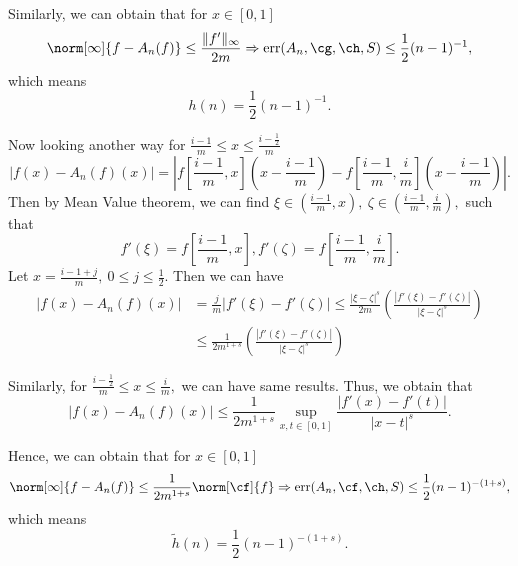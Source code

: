Similarly, we can obtain that for $x \in [0,1]$
\begin{equation}\label{errorg}\norm[\infty]{f-A_{n}(f)} \leq \frac{\|f'\|_{\infty}}{2m} \Rightarrow \err(A_n,\cg,\ch,S) \leq \frac{1}{2}(n-1)^{-1},
\end{equation}
which means
$$h(n)=\frac{1}{2}(n-1)^{-1}.$$

Now looking another way for $\frac{i-1}{m} \leq x \leq \frac{i-\frac{1}{2}}{m}$
$$\left|f(x)-A_{n}(f)(x)\right|=\left|f\left[\frac{i-1}{m},x\right]\left(x-\frac{i-1}{m}\right)-f\left[\frac{i-1}{m},\frac{i}{m}\right]\left(x-\frac{i-1}{m}\right)\right|.$$
Then by Mean Value theorem, we can find $\xi \in \left(\frac{i-1}{m},x\right), \ \zeta \in \left(\frac{i-1}{m},\frac{i}{m}\right),$ such that
$$f'(\xi)=f\left[\frac{i-1}{m},x\right],f'(\zeta)=f\left[\frac{i-1}{m},\frac{i}{m}\right].$$
Let $x=\frac{i-1+j}{m}, \ 0 \leq j \leq \frac{1}{2}.$ Then we can have
\begin{align*}
\left|f(x)-A_{n}(f)(x)\right|&=\frac{j}{m}|f'(\xi)-f'(\zeta)| \leq \frac{|\xi-\zeta|^{s}}{2m}\left(\frac{|f'(\xi)-f'(\zeta)|}{|\xi-\zeta|^{s}}\right)  \\
 & \leq \frac{1}{2m^{1+s}}\left(\frac{|f'(\xi)-f'(\zeta)|}{|\xi-\zeta|^{s}}\right)
\end{align*}

Similarly, for $\frac{i-\frac{1}{2}}{m} \leq x \leq \frac{i}{m},$ we can have same results.
Thus, we obtain that
$$\left|f(x)-A_{n}(f)(x)\right|\leq \frac{1}{2m^{1+s}}\sup\limits_{x,t \in [0,1]}\frac{|f'(x)-f'(t)|}{|x-t|^{s}}.$$

Hence, we can obtain that for $x \in [0,1]$
\begin{equation}\label{errorf}\norm[\infty]{f-A_{n}(f)} \leq  \frac{1}{2m^{1+s}}\norm[\cf]{f} \Rightarrow \err(A_n,\cf,\ch,S) \leq \frac{1}{2}(n-1)^{-(1+s)},
\end{equation}
which means $$\tilde{h}(n)=\frac{1}{2}(n-1)^{-(1+s)}.$$



